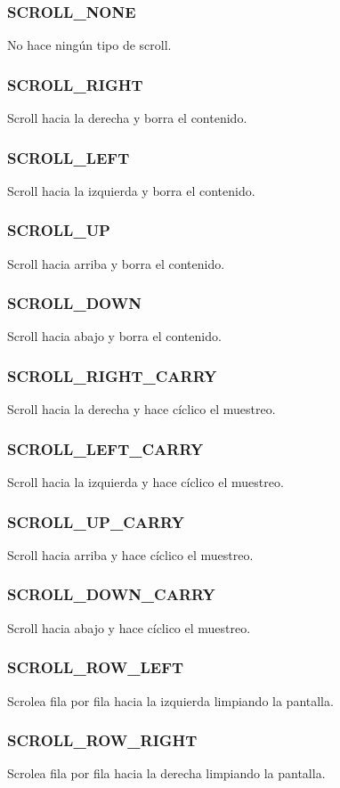 \documentclass[a4paper,11pt,epsf]{article}
\begin{document}
\subsubsection{SCROLL\_NONE}
No hace ning\'un tipo de scroll.
\subsubsection{SCROLL\_RIGHT}
Scroll hacia la derecha y borra el contenido.
\subsubsection{SCROLL\_LEFT}
Scroll hacia la izquierda y borra el contenido.
\subsubsection{SCROLL\_UP}
Scroll hacia arriba y borra el contenido.
\subsubsection{SCROLL\_DOWN}
Scroll hacia abajo y borra el contenido.
\subsubsection{SCROLL\_RIGHT\_CARRY}
Scroll hacia la derecha y hace c\'iclico el muestreo. 
\subsubsection{SCROLL\_LEFT\_CARRY}
Scroll hacia la izquierda y hace c\'iclico el muestreo. 
\subsubsection{SCROLL\_UP\_CARRY}
Scroll hacia arriba y hace c\'iclico el muestreo. 
\subsubsection{SCROLL\_DOWN\_CARRY}
Scroll hacia abajo y hace c\'iclico el muestreo. 
\subsubsection{SCROLL\_ROW\_LEFT}
Scrolea fila por fila hacia la izquierda limpiando la pantalla.
\subsubsection{SCROLL\_ROW\_RIGHT}
Scrolea fila por fila hacia la derecha limpiando la pantalla.
\end{document}
